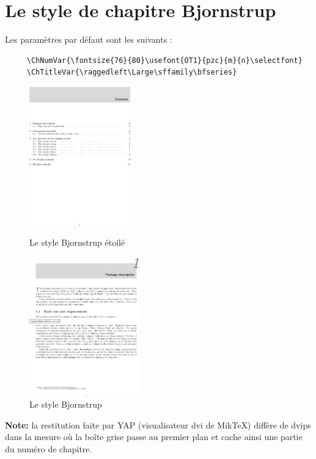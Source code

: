 \documentclass{report}
\begin{document}
    \section{Le style de chapitre Bjornstrup}
    Les paramètres par défaut sont les suivants :
    {\small\begin{verbatim}
     \ChNumVar{\fontsize{76}{80}\usefont{OT1}{pzc}{m}{n}\selectfont}
     \ChTitleVar{\raggedleft\Large\sffamily\bfseries}
    \end{verbatim}}
    \begin{figure}[h]
      \begin{minipage}{7 cm}
        \centerline{\includegraphics[height=6cm]{BjornstrupS.eps}} 
        \caption{Le style Bjornstrup \og étoilé \fg{}}
      \end{minipage}\hfill
      \begin{minipage}{7 cm}
        \centerline{\includegraphics[height=6cm]{Bjornstrup.eps}}
        \caption{Le style Bjornstrup}
      \end{minipage}\hfill
    \end{figure}
    \textbf{Note:} la restitution faite par YAP (visualisateur dvi de MikTeX)
    diffère de dvips dans la mesure où la boîte grise passe au premier plan et
    cache ainsi une partie du numéro de chapitre. 
    \enlargethispage{2cm}
\end{document}
